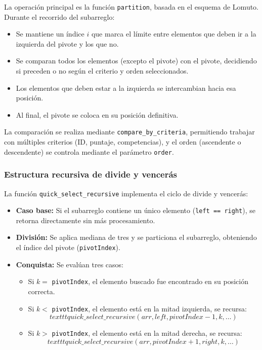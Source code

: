 La operación principal es la función \texttt{partition}, basada en el esquema de Lomuto. Durante el recorrido del subarreglo:

\begin{itemize}
    \item Se mantiene un índice \(i\) que marca el límite entre elementos que deben ir a la izquierda del pivote y los que no.
    \item Se comparan todos los elementos (excepto el pivote) con el pivote, decidiendo si preceden o no según el criterio y orden seleccionados.
    \item Los elementos que deben estar a la izquierda se intercambian hacia esa posición.
    \item Al final, el pivote se coloca en su posición definitiva.
\end{itemize}

La comparación se realiza mediante \texttt{compare\_by\_criteria}, permitiendo trabajar con múltiples criterios (ID, puntaje, competencias), y el orden (ascendente o descendente) se controla mediante el parámetro \texttt{order}.

\subsubsection{Estructura recursiva de divide y vencerás}

La función \texttt{quick\_select\_recursive} implementa el ciclo de divide y vencerás:

\begin{itemize}
    \item \textbf{Caso base:} Si el subarreglo contiene un único elemento (\texttt{left == right}), se retorna directamente sin más procesamiento.
    
    \item \textbf{División:} Se aplica mediana de tres y se particiona el subarreglo, obteniendo el índice del pivote (\texttt{pivotIndex}).
    
    \item \textbf{Conquista:} Se evalúan tres casos:
    \begin{itemize}
        \item Si \(k =\) \texttt{pivotIndex}, el elemento buscado fue encontrado en su posición correcta.
        \item Si \(k <\) \texttt{pivotIndex}, el elemento está en la mitad izquierda, se recursa:
        \[
        	texttt{quick\_select\_recursive(arr, left, pivotIndex - 1, k, \ldots)}
        \]
        \item Si \(k >\) \texttt{pivotIndex}, el elemento está en la mitad derecha, se recursa:
        \[
        	texttt{quick\_select\_recursive(arr, pivotIndex + 1, right, k, \ldots)}
        \]
    \end{itemize}
\end{itemize}

